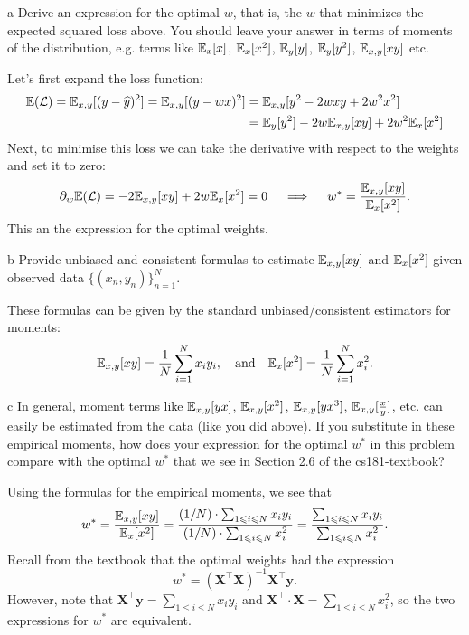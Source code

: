 \documentclass[expanded]{lkx_pset}
\begin{document}
\begin{parts}
	\begin{part}{a}
		Derive an expression for the optimal $w$, that is, the $w$
		that minimizes the expected squared loss above.  You should leave
		your answer in terms of moments of the distribution, e.g. terms
		like $\mathbb{E}_x[x]$, $\mathbb{E}_x[x^2]$, $\mathbb{E}_y[y]$, $\mathbb{E}_y[y^2]$, $\mathbb{E}_{x,y}[xy]$
		etc.
	\end{part}

	Let's first expand the loss function:
	\[
		\begin{aligned}
			\mathbb{E}(\mathcal{L}) = \mathbb{E}_{x,y}[(y-\widehat{y})^2] = \mathbb{E}_{x,y}[(y-wx)^2]
			 & = \mathbb{E}_{x,y}[y^2-2wxy+2w^2x^2]               \\
			 & = \mathbb{E}_{y}[y^2]-2w\mathbb{E}_{x,y}[xy]+2w^2\mathbb{E}_x[x^2]
		\end{aligned}
	\]
	Next, to minimise this loss we can take the derivative with respect to the weights and set it to zero:
	\[
		\begin{aligned}
			\partial_w \mathbb{E}(\mathcal{L}) = -2\mathbb{E}_{x,y}[xy]+2w\mathbb{E}_x[x^2] =0\quad
			\implies \quad w^* = \frac{\mathbb{E}_{x,y}[xy]}{\mathbb{E}_x[x^2]}.
		\end{aligned}
	\]
	This an the expression for the optimal weights.

	\begin{part}{b}
		Provide unbiased and consistent formulas to estimate $\mathbb{E}_{x, y}[xy]$
		and $\mathbb{E}_x[x^2]$ given observed data $\{(x_n,y_n)\}_{n=1}^N$.
	\end{part}

	These formulas can be given by the standard unbiased/consistent estimators for moments:
	\[
		\mathbb{E}_{x,y}[xy] = \frac{1}{N}\sum^N_{i=1} x_i y_i,\quad\textrm{and}\quad\mathbb{E}_x[x^2]=\frac{1}{N}\sum^N_{i=1} x_i^2.
	\]

	\begin{part}{c} In general, moment terms like $\mathbb{E}_{x, y}[yx]$, $\mathbb{E}_{x, y}[x^2]$,
		$\mathbb{E}_{x, y}[yx^3]$, $\mathbb{E}_{x, y}[\frac{x}{y}]$, etc. can easily be
		estimated from the data (like you did above).  If you substitute in
		these empirical moments, how does your expression for the optimal
		$w^*$ in this problem compare with the optimal $w^*$ that we see in
		Section 2.6 of the cs181-textbook?
	\end{part}

	Using the formulas for the empirical moments, we see that
	\[
		w^* = \frac{\mathbb{E}_{x,y}[xy]}{\mathbb{E}_x[x^2]} = \frac{(1/N)\cdot\sum_{1\leqslant i \leqslant N} x_iy_i}{(1/N)\cdot \sum_{1\leqslant i \leqslant N} x_i^2} = \frac{\sum_{1\leqslant i \leqslant N} x_iy_i}{\sum_{1\leqslant i \leqslant N} x_i^2}.
	\]
	Recall from the textbook that the optimal weights had the expression
	\[
		w^* = (\mathbf{X}^\intercal \mathbf{X})^{-1}\mathbf{X}^\intercal \mathbf{y}.
	\]
	However, note that $\mathbf{X}^\intercal \mathbf{y} = \sum_{1\leq i \leq N} x_i y_i$ and $\mathbf{X}^\intercal\cdot \mathbf{X} = \sum_{1\leq i\leq N} x_i^2$, so the two expressions for $w^*$ are equivalent.


\end{parts}
\end{document}
